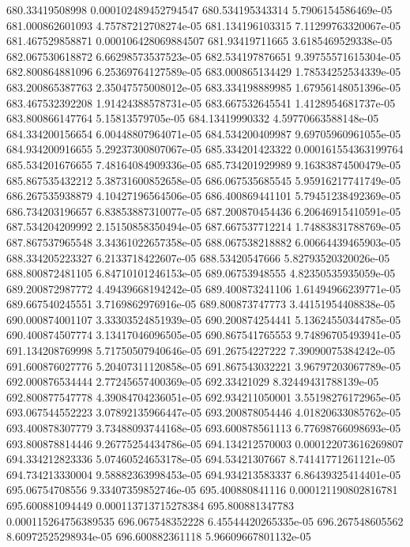 {680.33419508998 0.000102489452794547
680.534195343314 5.7906154586469e-05
681.000862601093 4.75787212708274e-05
681.134196103315 7.11299763320067e-05
681.467529858871 0.000106428069884507
681.93419711665 3.6185469529338e-05
682.067530618872 6.66298573537523e-05
682.534197876651 9.39755571615304e-05
682.800864881096 6.25369764127589e-05
683.000865134429 1.78534252534339e-05
683.200865387763 2.35047575008012e-05
683.334198889985 1.67956148051396e-05
683.467532392208 1.91424388578731e-05
683.667532645541 1.4128954681737e-05
683.800866147764 5.15813579705e-05
684.13419990332 4.59770663588148e-05
684.334200156654 6.00448807964071e-05
684.534200409987 9.69705960961055e-05
684.934200916655 5.29237300807067e-05
685.334201423322 0.000161554363199764
685.534201676655 7.48164084909336e-05
685.734201929989 9.16383874500479e-05
685.867535432212 5.38731600852658e-05
686.067535685545 5.95916217741749e-05
686.267535938879 4.10427196564506e-05
686.400869441101 5.79451238492369e-05
686.734203196657 6.83853887310077e-05
687.200870454436 6.20646915410591e-05
687.534204209992 2.15150858350494e-05
687.667537712214 1.74883831788769e-05
687.867537965548 3.34361022657358e-05
688.067538218882 6.00664439465903e-05
688.334205223327 6.2133718422607e-05
688.53420547666 5.82793520320026e-05
688.800872481105 6.84710101246153e-05
689.06753948555 4.82350535935059e-05
689.200872987772 4.49439668194242e-05
689.400873241106 1.61494966239771e-05
689.667540245551 3.7169862976916e-05
689.800873747773 3.44151954408838e-05
690.000874001107 3.33303524851939e-05
690.200874254441 5.13624550344785e-05
690.400874507774 3.13417046096505e-05
690.867541765553 9.74896705493941e-05
691.134208769998 5.71750507940646e-05
691.26754227222 7.39090075384242e-05
691.600876027776 5.20407311120858e-05
691.867543032221 3.96797203067789e-05
692.000876534444 2.77245657400369e-05
692.33421029 8.32449431788139e-05
692.800877547778 4.39084704236051e-05
692.934211050001 3.55198276172965e-05
693.067544552223 3.07892135966447e-05
693.200878054446 4.01820633085762e-05
693.400878307779 3.73488093744168e-05
693.600878561113 6.77698766098693e-05
693.800878814446 9.26775254434786e-05
694.134212570003 0.000122073616269807
694.334212823336 5.07460524653178e-05
694.53421307667 8.74141771261121e-05
694.734213330004 9.58882363998453e-05
694.934213583337 6.86439325414401e-05
695.06754708556 9.33407359852746e-05
695.400880841116 0.000121190802816781
695.600881094449 0.000113713715278384
695.800881347783 0.000115264756389535
696.067548352228 6.45544420265335e-05
696.267548605562 8.60972525298934e-05
696.600882361118 5.96609667801132e-05
}
